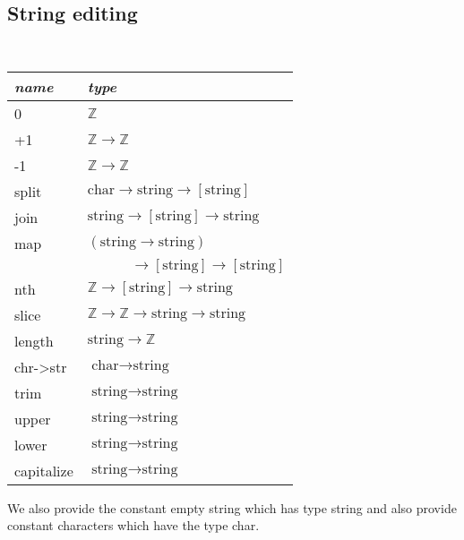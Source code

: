 \documentclass{article}
\begin{document}
\subsection{String editing}
\begin{center}
\tt
\begin{tabular}{| l | l |}
  \hline
  \textrm{\emph{name}} & \textrm{\emph{type}} \\
  \hline
  0&$\mathbb{Z}$\\
  +1&$\mathbb{Z}\to \mathbb{Z}$\\
  -1&$\mathbb{Z}\to \mathbb{Z}$\\
  split&$\text{char}\to \text{string}\to \left[\text{string} \right]$\\
  join&$\text{string}\to \left[\text{string} \right]\to \text{string}$\\
  map&$(\text{string}\to \text{string})$\\
  &$\qquad\quad\to\left[\text{string} \right]\to \left[\text{string} \right]$\\
  nth&$\mathbb{Z}\to \left[\text{string} \right]\to \text{string}$\\
  slice&$\mathbb{Z}\to \mathbb{Z}\to \text{string}\to \text{string}$\\
  length&$\text{string}\to \mathbb{Z}$\\
  chr->str&$\text{char}\to \text{string}$\\
  trim&$\text{string}\to \text{string}$\\
  upper&$\text{string}\to \text{string}$\\
  lower&$\text{string}\to \text{string}$\\
  capitalize&$\text{string}\to \text{string}$\\\hline
\end{tabular}
\end{center}
We also provide the constant empty string which has type string and also provide
constant characters which have the type char.


\vfill
\end{document}
